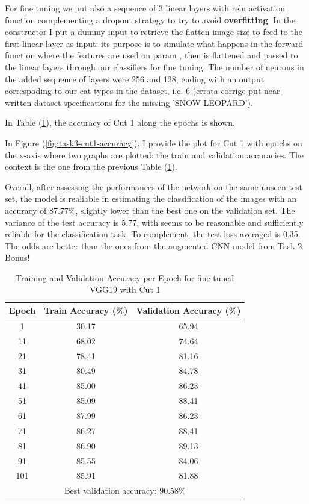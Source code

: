 \documentclass[11pt]{scrartcl}
\begin{document}
For fine tuning we put also a sequence of 3 linear layers 
with relu activation function complementing 
a dropout strategy to try to avoid \textbf{overfitting}.
In the constructor I put a dummy input to retrieve the flatten image
size to feed to the first linear layer as input:
its purpose is to simulate what happens in the forward function
where the features are used on param ,
then  is flattened and passed to the linear layers
through our classifiers for fine tuning.
The number of neurons in the added sequence of layers were 256 and 128, 
ending with an output correspoding to our cat types in the dataset, i.e. 6
(\underline{errata corrige put near written dataset specifications for the missing 'SNOW LEOPARD'}).

In Table (\ref{tab:task3-cut1-accuracy}),
the accuracy of Cut 1 along the epochs is shown.

In Figure (\ref{fig:task3-cut1-accuracy}), 
I provide the plot for Cut 1 with epochs on the x-axis where two graphs are plotted:
the train and validation accuracies.
The context is the one from the previous Table (\ref{tab:task3-cut1-accuracy}). 

Overall, after assessing the performances of the network on the same unseen test set,
the model is realiable in estimating the classification of the images with
an accuracy of 87.77\%, slightly lower than the best one on the validation set.
The variance of the test accuracy is 5.77,
with seems to be reasonable and sufficiently reliable for the classification task.
To complement, the test loss averaged is 0.35.
The odds are better than the ones from the augmented CNN model from Task 2 Bonus!

\begin{table}[htbp]
\centering
\caption{Training and Validation Accuracy per Epoch for fine-tuned VGG19 with Cut 1}
\begin{tabular}{ccc}
\toprule
\textbf{Epoch} & \textbf{Train Accuracy (\%)} & \textbf{Validation Accuracy (\%)} \\
\midrule
1    & 30.17  & 65.94 \\
11   & 68.02  & 74.64 \\
21   & 78.41  & 81.16 \\
31   & 80.49  & 84.78 \\
41   & 85.00  & 86.23 \\
51   & 85.09  & 88.41 \\
61   & 87.99  & 86.23 \\
71   & 86.27  & 88.41 \\
81   & 86.90  & 89.13 \\
91   & 85.55  & 84.06 \\
101  & 85.91  & 81.88 \\
\midrule
\multicolumn{3}{c}{Best validation accuracy: 90.58\%} \\
\bottomrule
\end{tabular}
\label{tab:task3-cut1-accuracy}
\end{table}
\end{document}
